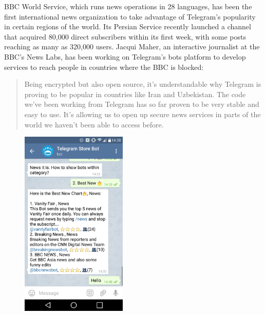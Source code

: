 \documentclass[notoc, symmetric, nobib, nols]{towcenter-guideto-book}
\begin{document}
BBC World Service, which runs news operations in 28 languages, has been the first international news organization to take advantage of Telegram's popularity in certain regions of the world. Its Persian Service recently launched a channel that acquired 80,000 direct subscribers within its first week, with some posts reaching as many as 320,000 users. Jacqui Maher, an interactive journalist at the BBC's News Labs, has been working on Telegram's bots platform to develop services to reach people in countries where the BBC is blocked: 

\begin{quote}
Being encrypted but also open source, it's understandable why Telegram is proving to be popular in countries like Iran and Uzbekistan. The code we've been working from Telegram has so far proven to be very stable and easy to use. It's allowing us to open up secure news services in parts of the world we haven't been able to access before.
\end{quote}

\begin{figure}
\includegraphics[width=0.45\textwidth]{graphics/CHATAPPS_Page35_Telegram1.png}
\end{figure}%
\end{document}
